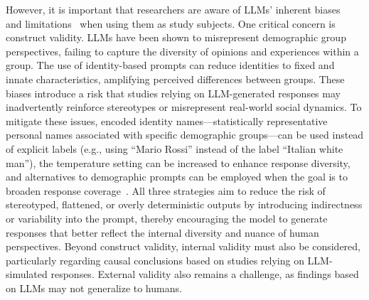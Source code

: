 However, it is important that researchers are aware of LLMs' inherent biases~\cite{Crowell2023} and limitations~\cite{DBLP:journals/ais/HardingDLL24, DBLP:journals/corr/abs-2402-01908} when using them as study subjects. 
One critical concern is construct validity. LLMs have been shown to misrepresent demographic group perspectives, %
failing to capture the diversity of opinions and experiences within a group.
The use of identity-based prompts can reduce identities to fixed and innate characteristics, amplifying perceived differences between groups.
These biases introduce a risk that studies relying on LLM-generated responses may inadvertently reinforce stereotypes or misrepresent real-world social dynamics.
To mitigate these issues, encoded identity names—statistically representative personal names associated with specific demographic groups—can be used instead of explicit labels (e.g., using “Mario Rossi” instead of the label “Italian white man”), the temperature setting can be increased to enhance response diversity, and alternatives to demographic prompts can be employed when the goal is to broaden response coverage~\cite{DBLP:journals/corr/abs-2402-01908}. All three strategies aim to reduce the risk of stereotyped, flattened, or overly deterministic outputs by introducing indirectness or variability into the prompt, thereby encouraging the model to generate responses that better reflect the internal diversity and nuance of human perspectives.
Beyond construct validity, internal validity must also be considered, particularly regarding causal conclusions based on studies relying on LLM-simulated responses.
External validity also remains a challenge, as findings based on LLMs may not generalize to humans.


